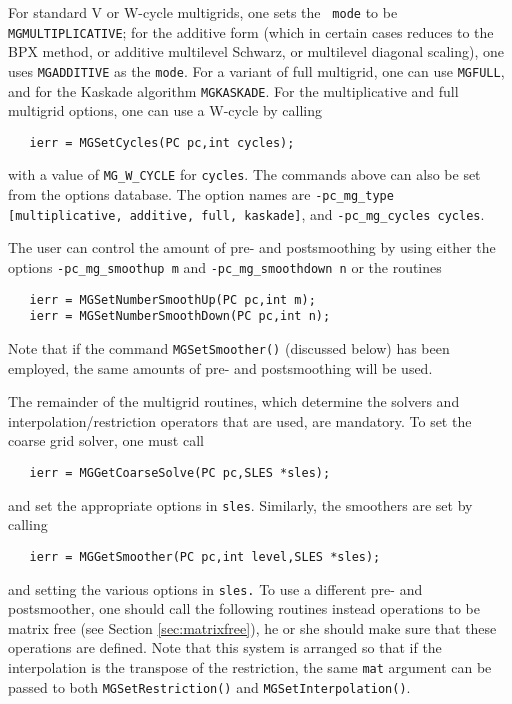 For standard V or W-cycle multigrids, one sets the {\tt
mode} to be  {\tt MGMULTIPLICATIVE}; for the
additive form (which in certain cases reduces to the BPX method, or additive 
multilevel Schwarz, or multilevel diagonal scaling), one uses
 {\tt MGADDITIVE} as the {\tt mode}.  For a variant
of full multigrid, one can
 use  {\tt MGFULL}, and for the Kaskade 
algorithm  {\tt MGKASKADE}.
For the multiplicative and full multigrid options, one can use a
W-cycle by   calling
 
\begin{verbatim}
   ierr = MGSetCycles(PC pc,int cycles);
\end{verbatim}
with a value of {\tt MG\_W\_CYCLE} for {\tt cycles}. 
The commands above can also be set from the options database. The option 
names are {\tt -pc\_mg\_type [multiplicative, additive, full, kaskade]},
and {\tt -pc\_mg\_cycles cycles}.  

The user can control the amount of pre- and postsmoothing 
  by using
either the options  
{\tt -pc\_mg\_smoothup~m} and {\tt -pc\_mg\_smoothdown~n} or
the routines  
\begin{verbatim}
   ierr = MGSetNumberSmoothUp(PC pc,int m);
   ierr = MGSetNumberSmoothDown(PC pc,int n);
\end{verbatim}
Note that if the command {\tt MGSetSmoother()} (discussed below) has
 been employed, the same amounts of pre-
and postsmoothing will be used.

The remainder of the multigrid routines, which determine
the solvers and interpolation/restriction operators that are used,
are mandatory.
To set the coarse grid solver, one must 
call 
\begin{verbatim}
   ierr = MGGetCoarseSolve(PC pc,SLES *sles);
\end{verbatim}
and set the appropriate options in {\tt sles}. Similarly, the 
smoothers are set by calling 
\begin{verbatim}
   ierr = MGGetSmoother(PC pc,int level,SLES *sles);
\end{verbatim}
and setting the various options in {\tt sles.} 
To use a different pre- and postsmoother, one should call the following
routines instead operations to be matrix free
(see Section \ref{sec:matrixfree}),
he or she should make sure that these operations are defined. 
Note that this system is arranged so that if the interpolation is 
the transpose of the restriction, the same {\tt mat} argument can be 
passed to both {\tt MGSetRestriction()} and {\tt MGSetInterpolation()}.

